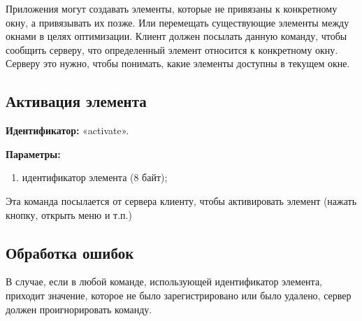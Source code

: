 Приложения могут создавать элементы, которые не привязаны к
конкретному окну, а привязывать их позже. Или перемещать существующие элементы
между окнами в целях оптимизации. Клиент должен посылать данную команду, чтобы
сообщить серверу, что определенный элемент относится к конкретному окну. Серверу
это нужно, чтобы понимать, какие элементы доступны в текущем окне.

\subsection{Активация элемента}

\textbf{Идентификатор:} «activate».

\textbf{Параметры:}
\begin{enumerate}
\item идентификатор элемента (8 байт);
\end{enumerate}

Эта команда посылается от сервера клиенту, чтобы активировать элемент (нажать
кнопку, открыть меню и т.п.)

\subsection{Обработка ошибок}

В случае, если в любой команде, использующей идентификатор элемента,
приходит значение, которое не было зарегистрировано или было удалено, сервер
должен проигнорировать команду.
